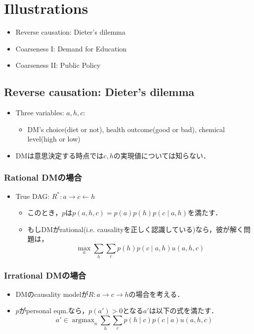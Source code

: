 \documentclass[11pt,a4paper,dvipdfmx]{article}
\theoremstyle{plain}
\DeclareMathOperator*{\argmax}{argmax}
\begin{document}
\section{Illustrations}
\begin{itemize}
	\item Reverse causation: Dieter's dilemma
	\item Coarseness I: Demand for Education
	\item Coarseness II: Public Policy
\end{itemize}

\subsection{Reverse causation: Dieter's dilemma}
\begin{itemize}
	\item Three variables: $a, h, c$:
	\begin{itemize}
		\item DM's choice(diet or not), health outcome(good or bad), chemical level(high or low) 
	\end{itemize}
	\item DMは意思決定する時点では$c, h$の実現値については知らない．
\end{itemize}


\subsubsection{Rational DMの場合}
\begin{itemize}
	\item True DAG: $R^*: a \rightarrow c \leftarrow h$
	\begin{itemize}
		\item このとき，$p$は$p(a, h, c) = p(a)p(h)p(c \mid a,h)$を満たす．
		\item もしDMがrational(i.e. causalityを正しく認識している)なら，彼が解く問題は，
		$$
		\max_{a} \sum_h \sum_c p(h)p(c \mid a,h) u(a,h,c)
		$$
	\end{itemize}
\end{itemize}


\subsubsection{Irrational DMの場合}
\begin{itemize}
	\item DMのcausality modelが$R: a \rightarrow c \rightarrow h$の場合を考える．
	\item $p$がpersonal eqm.なら，$p(a') > 0$となる$a'$は以下の式を満たす．
	$$
	a' \in \argmax_{a} \sum_h \sum_c p(h \mid c) p(c \mid a) u(a,h,c)
	$$
\end{itemize}
\end{document}
